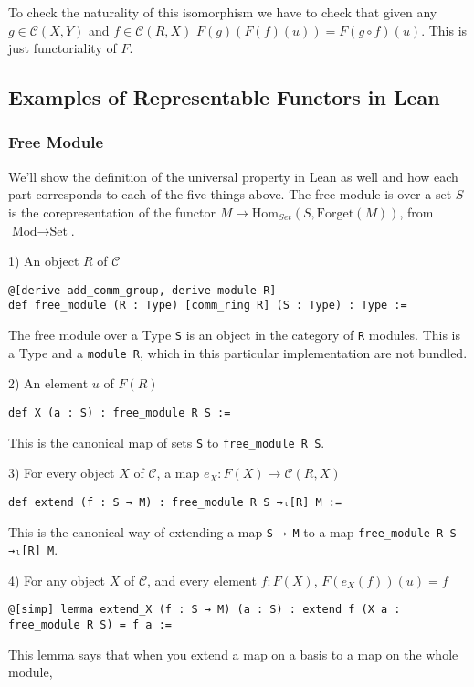 \documentclass[12pt]{article} %
\theoremstyle{definition}
\theoremstyle{definition}
\theoremstyle{definition}
\theoremstyle{definition}
\begin{document}
To check the naturality of this isomorphism we have to check that given 
any $g \in \mathcal{C}(X,Y)$ and $f \in \mathcal{C}(R, X)$
$F(g)(F(f)(u)) = F(g \circ f)(u)$. This is just functoriality of $F$.

\subsection{Examples of Representable Functors in Lean}

\subsubsection{Free Module}
We'll show the definition of the universal property in Lean as well and how each part corresponds to each
of the five things above. The free module is over a set $S$ is the corepresentation of the functor 
$M \mapsto \text{Hom}_{Set}(S, \text{Forget}(M))$, from $\text{Mod} \to \text{Set}$.

1) An object $R$ of $\mathcal{C}$
\begin{lstlisting}
@[derive add_comm_group, derive module R]
def free_module (R : Type) [comm_ring R] (S : Type) : Type :=
\end{lstlisting}
The free module over a Type \lstinline{S} is an object in the category of \lstinline{R}
modules. This is a Type and a \lstinline{module R}, which in this particular implementation
are not bundled.


2) An element $u$ of $F(R)$
\begin{lstlisting}
def X (a : S) : free_module R S :=
\end{lstlisting}
This is the canonical map of sets \lstinline{S} to \lstinline{free_module R S}.

3) For every object $X$ of $\mathcal{C}$, a map $e_X : F(X) \to \mathcal{C}(R, X)$
\begin{lstlisting}
def extend (f : S → M) : free_module R S →ₗ[R] M :=
\end{lstlisting}
This is the canonical way of extending a map \lstinline{S → M} to a map 
\lstinline{free_module R S →ₗ[R] M}.

4) For any object $X$ of $\mathcal{C}$, and every element $f : F(X)$, $F(e_X(f))(u) = f$
\begin{lstlisting}
@[simp] lemma extend_X (f : S → M) (a : S) : extend f (X a : free_module R S) = f a :=
\end{lstlisting}
This lemma says that when you extend a map on a basis to a map on the whole module,
\end{document}
